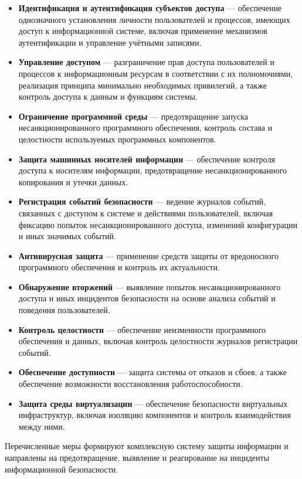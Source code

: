 \begin{itemize}
    \item \textbf{Идентификация и аутентификация субъектов доступа} — обеспечение однозначного установления личности пользователей и процессов, имеющих доступ к информационной системе, включая применение механизмов аутентификации и управление учётными записями.
    \item \textbf{Управление доступом} — разграничение прав доступа пользователей и процессов к информационным ресурсам в соответствии с их полномочиями, реализация принципа минимально необходимых привилегий, а также контроль доступа к данным и функциям системы.
    \item \textbf{Ограничение программной среды} — предотвращение запуска несанкционированного программного обеспечения, контроль состава и целостности используемых программных компонентов.
    \item \textbf{Защита машинных носителей информации} — обеспечение контроля доступа к носителям информации, предотвращение несанкционированного копирования и утечки данных.
    \item \textbf{Регистрация событий безопасности} — ведение журналов событий, связанных с доступом к системе и действиями пользователей, включая фиксацию попыток несанкционированного доступа, изменений конфигурации и иных значимых событий.
    \item \textbf{Антивирусная защита} — применение средств защиты от вредоносного программного обеспечения и контроль их актуальности.
    \item \textbf{Обнаружение вторжений} — выявление попыток несанкционированного доступа и иных инцидентов безопасности на основе анализа событий и поведения пользователей.
    \item \textbf{Контроль целостности} — обеспечение неизменности программного обеспечения и данных, включая контроль целостности журналов регистрации событий.
    \item \textbf{Обеспечение доступности} — защита системы от отказов и сбоев, а также обеспечение возможности восстановления работоспособности.
    \item \textbf{Защита среды виртуализации} — обеспечение безопасности виртуальных инфраструктур, включая изоляцию компонентов и контроль взаимодействия между ними.
\end{itemize}

Перечисленные меры формируют комплексную систему защиты информации и направлены на предотвращение, выявление и реагирование на инциденты информационной безопасности.

